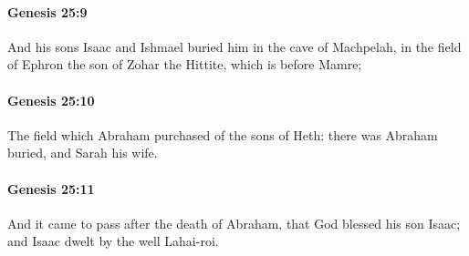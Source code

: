 		\paragraph{Genesis 25:9} %
			\label{GENESIS-25-9}

			And his sons Isaac and Ishmael buried him in the cave of Machpelah, in the field of Ephron the son of Zohar the Hittite, which is before Mamre;


		\paragraph{Genesis 25:10} %
			\label{GENESIS-25-10}

			The field which Abraham purchased of the sons of Heth: there was Abraham buried, and Sarah his wife.


		\paragraph{Genesis 25:11} %
			\label{GENESIS-25-11}

			And it came to pass after the death of Abraham, that God blessed his son Isaac; and Isaac dwelt by the well Lahai-roi.


